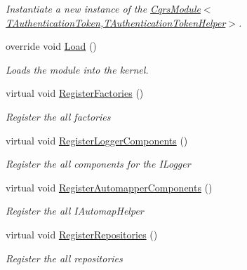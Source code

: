 \begin{DoxyCompactItemize}
\begin{DoxyCompactList}\small\item\em Instantiate a new instance of the \hyperlink{classCqrs_1_1Ninject_1_1Configuration_1_1CqrsModule_a31a1047d3940842b760ad2a796aa1606_a31a1047d3940842b760ad2a796aa1606}{Cqrs\+Module$<$\+T\+Authentication\+Token,\+T\+Authentication\+Token\+Helper$>$}. \end{DoxyCompactList}\item 
override void \hyperlink{classCqrs_1_1Ninject_1_1Configuration_1_1CqrsModule_a8cf4c81c21496699b2f32112b23308fe_a8cf4c81c21496699b2f32112b23308fe}{Load} ()
\begin{DoxyCompactList}\small\item\em Loads the module into the kernel. \end{DoxyCompactList}\item 
virtual void \hyperlink{classCqrs_1_1Ninject_1_1Configuration_1_1CqrsModule_afae0f84460f7cf9d1f9b62ec148b02ad_afae0f84460f7cf9d1f9b62ec148b02ad}{Register\+Factories} ()
\begin{DoxyCompactList}\small\item\em Register the all factories \end{DoxyCompactList}\item 
virtual void \hyperlink{classCqrs_1_1Ninject_1_1Configuration_1_1CqrsModule_a7bb448b4c38d7a4628a30ba709dc8a36_a7bb448b4c38d7a4628a30ba709dc8a36}{Register\+Logger\+Components} ()
\begin{DoxyCompactList}\small\item\em Register the all components for the I\+Logger \end{DoxyCompactList}\item 
virtual void \hyperlink{classCqrs_1_1Ninject_1_1Configuration_1_1CqrsModule_a5c3b6741270b2cb16aa1a1a84c57041b_a5c3b6741270b2cb16aa1a1a84c57041b}{Register\+Automapper\+Components} ()
\begin{DoxyCompactList}\small\item\em Register the all I\+Automap\+Helper \end{DoxyCompactList}\item 
virtual void \hyperlink{classCqrs_1_1Ninject_1_1Configuration_1_1CqrsModule_a3437afb1ea306ff4e65eb2ca22a276d9_a3437afb1ea306ff4e65eb2ca22a276d9}{Register\+Repositories} ()
\begin{DoxyCompactList}\small\item\em Register the all repositories \end{DoxyCompactList}\item 

\end{DoxyCompactItemize}
